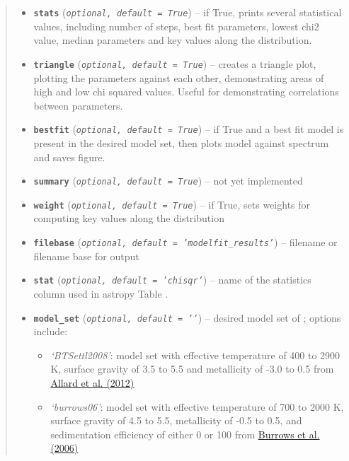 \documentclass[letterpaper,10pt,english]{sphinxmanual}
\begin{document}
\begin{fulllineitems}
\begin{quote}
\begin{description}
\begin{itemize}
\begin{itemize}
\end{itemize}


\item {} 
\textbf{\texttt{stats}} (\emph{\texttt{optional, default = True}}) -- if True, prints several statistical values, including number of steps,
best fit parameters, lowest chi2 value, median parameters and key values
along the distribution.

\item {} 
\textbf{\texttt{triangle}} (\emph{\texttt{optional, default = True}}) -- creates a triangle plot, plotting the parameters against each other,
demonstrating areas of high and low chi squared values. Useful for
demonstrating correlations between parameters.

\item {} 
\textbf{\texttt{bestfit}} (\emph{\texttt{optional, default = True}}) -- if True and a best fit model is present in the desired model set, then
plots model against spectrum and saves figure.

\item {} 
\textbf{\texttt{summary}} (\emph{\texttt{optional, default = True}}) -- not yet implemented

\item {} 
\textbf{\texttt{weight}} (\emph{\texttt{optional, default = True}}) -- if True, sets weights for computing key values along the distribution

\item {} 
\textbf{\texttt{filebase}} (\emph{\texttt{optional, default = 'modelfit\_results'}}) -- filename or filename base for output

\item {} 
\textbf{\texttt{stat}} (\emph{\texttt{optional, default = 'chisqr'}}) -- name of the statistics column used in astropy Table .

\item {} 
\textbf{\texttt{model\_set}} (\emph{\texttt{optional, default = '{'}}}) -- 
desired model set of ; options include:
\begin{itemize}
\item {} 
\emph{`BTSettl2008'}: model set with effective temperature of 400 to 2900 K, surface gravity of 3.5 to 5.5 and metallicity of -3.0 to 0.5
from \href{http://adsabs.harvard.edu/abs/2012RSPTA.370.2765A}{Allard et al. (2012)}

\item {} 
\emph{`burrows06'}: model set with effective temperature of 700 to 2000 K, surface gravity of 4.5 to 5.5, metallicity of -0.5 to 0.5,
and sedimentation efficiency of either 0 or 100 from \href{http://adsabs.harvard.edu/abs/2006ApJ...640.1063B}{Burrows et al. (2006)}


\end{itemize}
\end{itemize}
\end{description}
\end{quote}
\end{fulllineitems}
\end{document}
